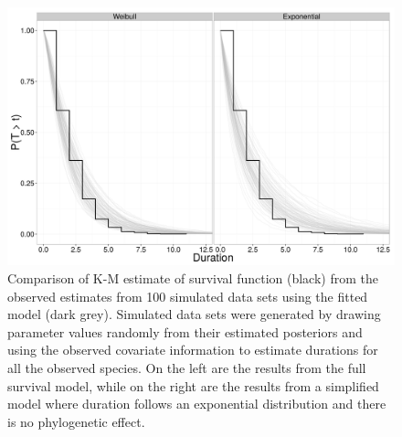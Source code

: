 \documentclass[12pt]{article}
\begin{document}
\clearpage


\begin{figure}[ht]
  \centering
  \includegraphics[height = 0.5\textheight, width = \textwidth, keepaspectratio = true]{figure/survival_function}
  \caption{Comparison of K-M estimate of survival function (black) from the observed estimates from 100 simulated data sets using the fitted model (dark grey). Simulated data sets were generated by drawing parameter values randomly from their estimated posteriors and using the observed covariate information to estimate durations for all the observed species. On the left are the results from the full survival model, while on the right are the results from a simplified model where duration follows an exponential distribution and there is no phylogenetic effect.}
  \label{fig:ppc_surv}
\end{figure}
\end{document}
